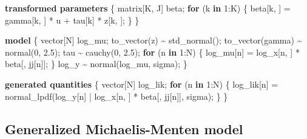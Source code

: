 \documentclass[
  12pt,
  letterpaper,
  DIV=11,
  numbers=noendperiod]{scrartcl}
\newenvironment{Shaded}{\begin{snugshade}}{\end{snugshade}}
\newcommand{\ControlFlowTok}[1]{\textcolor[rgb]{0.00,0.23,0.31}{\textbf{#1}}}
\newcommand{\DataTypeTok}[1]{\textcolor[rgb]{0.68,0.00,0.00}{#1}}
\newcommand{\DecValTok}[1]{\textcolor[rgb]{0.68,0.00,0.00}{#1}}
\newcommand{\FloatTok}[1]{\textcolor[rgb]{0.68,0.00,0.00}{#1}}
\newcommand{\KeywordTok}[1]{\textcolor[rgb]{0.00,0.23,0.31}{\textbf{#1}}}
\newcommand{\NormalTok}[1]{\textcolor[rgb]{0.00,0.23,0.31}{#1}}
\begin{document}
\begin{Shaded}
\begin{Highlighting}[]
\KeywordTok{transformed parameters}\NormalTok{ \{}
  \DataTypeTok{matrix}\NormalTok{[K, J] beta;}
  \ControlFlowTok{for}\NormalTok{ (k }\ControlFlowTok{in} \DecValTok{1}\NormalTok{:K) \{}
\NormalTok{    beta[k, ] = gamma[k, ] * u + tau[k] * z[k, ];}
\NormalTok{  \}}
\NormalTok{\}}

\KeywordTok{model}\NormalTok{ \{}
  \DataTypeTok{vector}\NormalTok{[N] log\_mu;}
\NormalTok{  to\_vector(z) \textasciitilde{} std\_normal();}
\NormalTok{  to\_vector(gamma) \textasciitilde{} normal(}\DecValTok{0}\NormalTok{, }\FloatTok{2.5}\NormalTok{);}
\NormalTok{  tau \textasciitilde{} cauchy(}\DecValTok{0}\NormalTok{, }\FloatTok{2.5}\NormalTok{);}
  \ControlFlowTok{for}\NormalTok{ (n }\ControlFlowTok{in} \DecValTok{1}\NormalTok{:N) \{}
\NormalTok{    log\_mu[n] = log\_x[n, ] * beta[, jj[n]];}
\NormalTok{  \}}
\NormalTok{  log\_y \textasciitilde{} normal(log\_mu, sigma);}
\NormalTok{\}}

\KeywordTok{generated quantities}\NormalTok{ \{}
  \DataTypeTok{vector}\NormalTok{[N] log\_lik;}
  \ControlFlowTok{for}\NormalTok{ (n }\ControlFlowTok{in} \DecValTok{1}\NormalTok{:N) \{}
\NormalTok{    log\_lik[n] = normal\_lpdf(log\_y[n] | log\_x[n, ] * beta[, jj[n]], sigma);}
\NormalTok{  \}}
\NormalTok{\}}
\end{Highlighting}
\end{Shaded}

\newpage

\subsection{Generalized Michaelis-Menten
model}\label{generalized-michaelis-menten-model}
\end{document}
